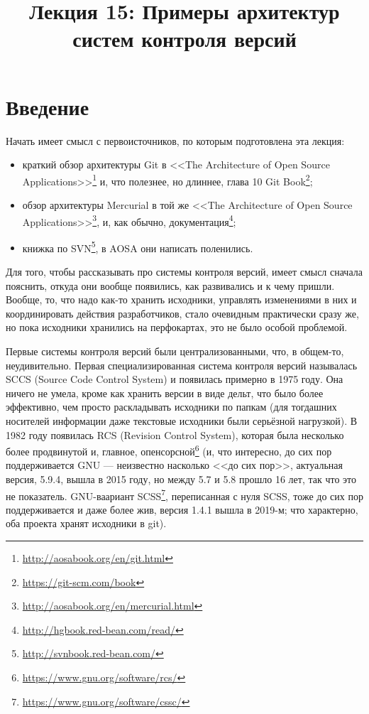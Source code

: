 \documentclass[a5paper]{article}
\title{Лекция 15: Примеры архитектур систем контроля версий}
\date{}
\begin{document}
\maketitle
\thispagestyle{empty}

\section{Введение}

Начать имеет смысл с первоисточников, по которым подготовлена эта лекция:
\begin{itemize}
	\item краткий обзор архитектуры Git в <<The Architecture of Open Source Applications>>\footnote{\url{http://aosabook.org/en/git.html}} и, что полезнее, но длиннее, глава 10 Git Book\footnote{\url{https://git-scm.com/book}};
	\item обзор архитектуры Mercurial в той же <<The Architecture of Open Source Applications>>\footnote{\url{http://aosabook.org/en/mercurial.html}}, и, как обычно, документация\footnote{\url{http://hgbook.red-bean.com/read/}};
	\item книжка по SVN\footnote{\url{http://svnbook.red-bean.com/}}, в AOSA они написать поленились.
\end{itemize}

Для того, чтобы рассказывать про системы контроля версий, имеет смысл сначала пояснить, откуда они вообще появились, как развивались и к чему пришли. Вообще, то, что надо как-то хранить исходники, управлять изменениями в них и координировать действия разработчиков, стало очевидным практически сразу же, но пока исходники хранились на перфокартах, это не было особой проблемой.

Первые системы контроля версий были централизованными, что, в общем-то, неудивительно. Первая специализированная система контроля версий называлась SCCS (Source Code Control System) и появилась примерно в 1975 году. Она ничего не умела, кроме как хранить версии в виде дельт, что было более эффективно, чем просто раскладывать исходники по папкам (для тогдашних носителей информации даже текстовые исходники были серьёзной нагрузкой). В 1982 году появилась RCS (Revision Control System), которая была несколько более продвинутой и, главное, опенсорсной\footnote{\url{https://www.gnu.org/software/rcs/}} (и, что интересно, до сих пор поддерживается GNU --- неизвестно насколько <<до сих пор>>, актуальная версия, 5.9.4, вышла в 2015 году, но между 5.7 и 5.8 прошло 16 лет, так что это не показатель. GNU-ваариант SCSS\footnote{\url{https://www.gnu.org/software/cssc/}}, переписанная с нуля SCSS, тоже до сих пор поддерживается и даже более жив, версия 1.4.1 вышла в 2019-м; что характерно, оба проекта хранят исходники в git).
\end{document}
